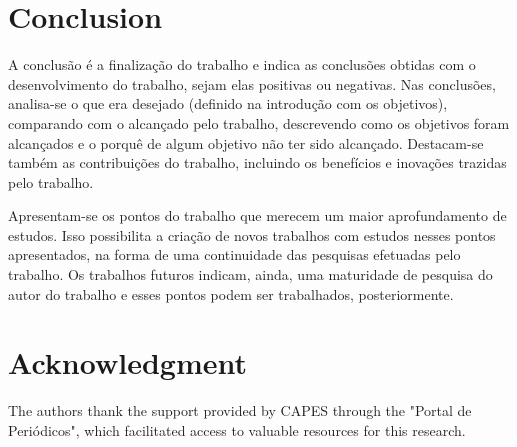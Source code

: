 \documentclass[12pt]{article}
\begin{document}
	\section{Conclusion}
	\label{sec_conclusao}
	
	A conclusão é a finalização do trabalho e indica as conclusões obtidas com o desenvolvimento do trabalho, sejam elas positivas ou negativas. Nas conclusões, analisa-se o que era desejado (definido na introdução com os objetivos), comparando com o alcançado pelo trabalho, descrevendo como os objetivos foram alcançados e o porquê de algum objetivo não ter sido alcançado. Destacam-se também as contribuições do trabalho, incluindo os benefícios e inovações trazidas pelo trabalho.
	
	Apresentam-se os pontos do trabalho que merecem um maior aprofundamento de estudos. Isso possibilita a criação de novos trabalhos com estudos nesses pontos apresentados, na forma de uma continuidade das pesquisas efetuadas pelo trabalho. Os trabalhos futuros indicam, ainda, uma maturidade de pesquisa do autor do trabalho e esses pontos podem ser trabalhados, posteriormente.
	
	\section*{Acknowledgment}
	The authors thank the support provided by CAPES through the "Portal de Periódicos", which facilitated access to valuable resources for this research.
	
    
	
	
\end{document}

